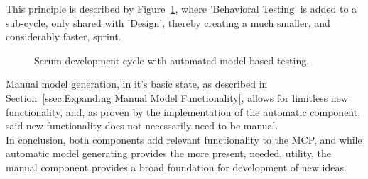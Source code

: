 This principle is described by Figure~\ref{fig:scrumSmall}, where 'Behavioral Testing' is added to a sub-cycle, only shared with 'Design', thereby creating a much smaller, and considerably faster, sprint.
\newpage
\begin{figure}[h]
  \centering
  \caption{Scrum development cycle with automated model-based testing.}
  \label{fig:scrumSmall}
\end{figure}

Manual model generation, in it's basic state, as described in Section~\ref{ssec:Expanding Manual Model Functionality}, allows for limitless new functionality, and, as proven by the implementation of the automatic component, said new functionality does not necessarily need to be manual.\\[0.5cm]
In conclusion, both components add relevant functionality to the MCP, and while automatic model generating provides the more present, needed, utility, the manual component provides a broad foundation for development of new ideas.

